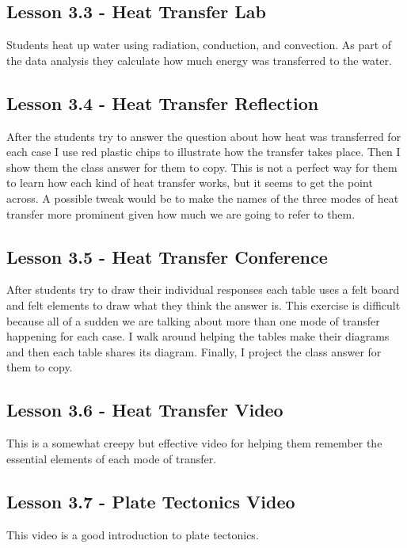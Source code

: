 \documentclass[12pt]{article}
\begin{document}
\subsection{Lesson 3.3 - Heat Transfer Lab}

Students heat up water using radiation, conduction, and
convection. As part of the data analysis they calculate how much energy was transferred
to the water.

\subsection{Lesson 3.4 - Heat Transfer Reflection}

After the students try to answer the question about how heat was transferred for each case I use red plastic chips to illustrate how the transfer takes place. Then I show them the class answer for them to copy. This is not a perfect way for them to learn how each kind of heat transfer works, but it seems to get
the point across. A possible tweak would be to make the names of the three modes of heat transfer more prominent given how much we are going to refer to them.

\subsection{Lesson 3.5 - Heat Transfer Conference}

After students try to draw their individual responses each table uses a felt board and felt elements to draw what they think the
answer is. This exercise is difficult because all of a sudden we are talking about more than one mode of transfer happening for each case. I walk around helping the tables make their diagrams and then each table shares its diagram. Finally, I project the class answer for them to copy.

\subsection{Lesson 3.6 - Heat Transfer Video}

This is a somewhat creepy but effective video for helping them remember the essential elements of each mode of transfer.

\subsection{Lesson 3.7 - Plate Tectonics Video}

This video is a good introduction to plate tectonics.
\end{document}
